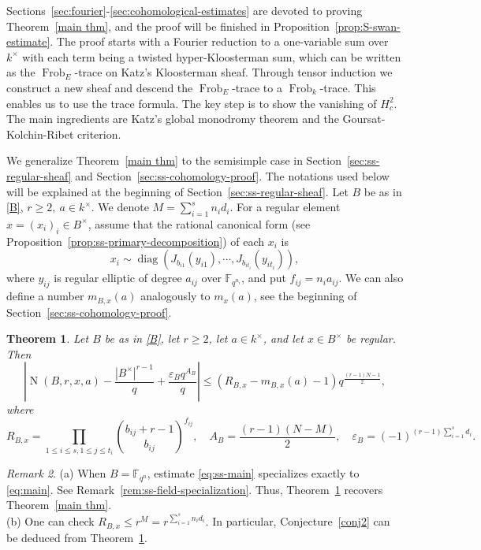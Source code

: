 \documentclass[11pt]{amsart}
\newtheorem{theorem}{Theorem}[section]
\theoremstyle{remark}
\newtheorem{remark}[theorem]{Remark}
\newcommand{\F}{\mathbb F}
\newcommand{\Frob}{\operatorname{Frob}}
\newcommand{\Nm}{\operatorname{N}}
\begin{document}
Sections~\ref{sec:fourier}-\ref{sec:cohomological-estimates} are devoted to proving Theorem~\ref{main thm}, and the proof will be finished in Proposition~\ref{prop:S-swan-estimate}. The proof starts with a Fourier reduction to a one-variable sum over $k^{\times}$ with each term being a twisted hyper-Kloosterman sum, which can be written as the $\Frob_E$-trace on Katz's Kloosterman sheaf. Through tensor induction we construct a new sheaf and descend the $\Frob_E$-trace to a $\Frob_k$-trace. This enables us to use the trace formula. The key step is to show the vanishing of $H_c^2$. The main ingredients are Katz's global monodromy theorem and the Goursat-Kolchin-Ribet criterion.

We generalize Theorem~\ref{main thm} to the semisimple case in Section~\ref{sec:ss-regular-sheaf}
and Section~\ref{sec:ss-cohomology-proof}. The notations used below will be explained at the beginning of Section~\ref{sec:ss-regular-sheaf}. Let $B$ be as in \eqref{B}, $r\ge2,~a\in k^{\times}$. We denote $M=\sum_{i=1}^s n_i d_i$. For a regular element
$x=(x_i)_i\in B^{\times}$, assume that the rational canonical form (see Proposition~\ref{prop:ss-primary-decomposition}) of each $x_i$ is
\[
x_i\sim\operatorname{diag}\left(J_{b_{i1}}(y_{i1}),\cdots,
 J_{b_{i t_i}}(y_{i t_i})\right),
\]
where $y_{i j}$ is regular elliptic of degree $a_{i j}$ over
$\F_{q^{n_i}}$, and put $f_{i j}=n_i a_{i j}$. We can also define a number $m_{B,x}(a)$ analogously to $ m_x(a)$, see the beginning of Section~\ref{sec:ss-cohomology-proof}.

\begin{theorem}\label{thm:ss-main}
Let $B$ be as in \eqref{B}, let $r\ge 2$, let
$a\in k^{\times}$, and let $x\in B^{\times}$ be regular. Then
\begin{equation}\label{eq:ss-main}
\left|\Nm(B,r,x,a)-\frac{|B^{\times}|^{r-1}}{q}
 +\frac{\varepsilon_B q^{A_B}}{q}\right|\le
\left(R_{B,x}-m_{B,x}(a)-1\right)q^{\frac{(r-1)N-1}{2}},
\end{equation}
where
\[
R_{B,x}=\prod_{1\le i\le s,1\le j\le t_i}\binom{b_{i j}+r-1}{b_{i j}}^{f_{i j}},\quad A_B=\frac{(r-1)(N-M)}{2},\quad \varepsilon_B=(-1)^{(r-1)\sum_{i=1}^s d_i}.
\]
\end{theorem}

\begin{remark}
(a)  When $B=\F_{q^n}$, estimate \eqref{eq:ss-main} specializes exactly to \eqref{eq:main}. See Remark~\ref{rem:ss-field-specialization}. Thus, Theorem~\ref{thm:ss-main} recovers Theorem~\ref{main thm}.\\
(b) One can check $R_{B,x}\le r^M =r^{\sum_{i=1}^s n_i d_i}$. In particular, Conjecture~\ref{conj2} can be deduced from Theorem~\ref{thm:ss-main}.
\end{remark}
\end{document}
